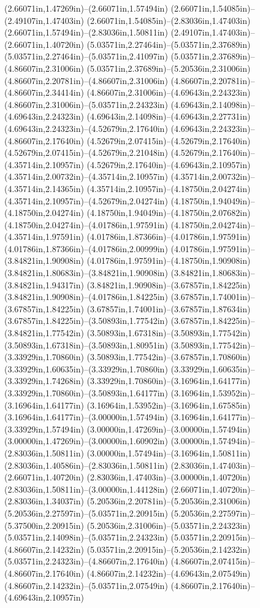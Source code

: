 (2.66071in,1.47269in)--(2.66071in,1.57494in) (2.66071in,1.54085in)--(2.49107in,1.47403in) (2.66071in,1.54085in)--(2.83036in,1.47403in) (2.66071in,1.57494in)--(2.83036in,1.50811in) (2.49107in,1.47403in)--(2.66071in,1.40720in) (5.03571in,2.27464in)--(5.03571in,2.37689in) (5.03571in,2.27464in)--(5.03571in,2.41097in) (5.03571in,2.37689in)--(4.86607in,2.31006in) (5.03571in,2.37689in)--(5.20536in,2.31006in) (4.86607in,2.20781in)--(4.86607in,2.31006in) (4.86607in,2.20781in)--(4.86607in,2.34414in) (4.86607in,2.31006in)--(4.69643in,2.24323in) (4.86607in,2.31006in)--(5.03571in,2.24323in) (4.69643in,2.14098in)--(4.69643in,2.24323in) (4.69643in,2.14098in)--(4.69643in,2.27731in) (4.69643in,2.24323in)--(4.52679in,2.17640in) (4.69643in,2.24323in)--(4.86607in,2.17640in) (4.52679in,2.07415in)--(4.52679in,2.17640in) (4.52679in,2.07415in)--(4.52679in,2.21048in) (4.52679in,2.17640in)--(4.35714in,2.10957in) (4.52679in,2.17640in)--(4.69643in,2.10957in) (4.35714in,2.00732in)--(4.35714in,2.10957in) (4.35714in,2.00732in)--(4.35714in,2.14365in) (4.35714in,2.10957in)--(4.18750in,2.04274in) (4.35714in,2.10957in)--(4.52679in,2.04274in) (4.18750in,1.94049in)--(4.18750in,2.04274in) (4.18750in,1.94049in)--(4.18750in,2.07682in) (4.18750in,2.04274in)--(4.01786in,1.97591in) (4.18750in,2.04274in)--(4.35714in,1.97591in) (4.01786in,1.87366in)--(4.01786in,1.97591in) (4.01786in,1.87366in)--(4.01786in,2.00999in) (4.01786in,1.97591in)--(3.84821in,1.90908in) (4.01786in,1.97591in)--(4.18750in,1.90908in) (3.84821in,1.80683in)--(3.84821in,1.90908in) (3.84821in,1.80683in)--(3.84821in,1.94317in) (3.84821in,1.90908in)--(3.67857in,1.84225in) (3.84821in,1.90908in)--(4.01786in,1.84225in) (3.67857in,1.74001in)--(3.67857in,1.84225in) (3.67857in,1.74001in)--(3.67857in,1.87634in) (3.67857in,1.84225in)--(3.50893in,1.77542in) (3.67857in,1.84225in)--(3.84821in,1.77542in) (3.50893in,1.67318in)--(3.50893in,1.77542in) (3.50893in,1.67318in)--(3.50893in,1.80951in) (3.50893in,1.77542in)--(3.33929in,1.70860in) (3.50893in,1.77542in)--(3.67857in,1.70860in) (3.33929in,1.60635in)--(3.33929in,1.70860in) (3.33929in,1.60635in)--(3.33929in,1.74268in) (3.33929in,1.70860in)--(3.16964in,1.64177in) (3.33929in,1.70860in)--(3.50893in,1.64177in) (3.16964in,1.53952in)--(3.16964in,1.64177in) (3.16964in,1.53952in)--(3.16964in,1.67585in) (3.16964in,1.64177in)--(3.00000in,1.57494in) (3.16964in,1.64177in)--(3.33929in,1.57494in) (3.00000in,1.47269in)--(3.00000in,1.57494in) (3.00000in,1.47269in)--(3.00000in,1.60902in) (3.00000in,1.57494in)--(2.83036in,1.50811in) (3.00000in,1.57494in)--(3.16964in,1.50811in) (2.83036in,1.40586in)--(2.83036in,1.50811in) (2.83036in,1.47403in)--(2.66071in,1.40720in) (2.83036in,1.47403in)--(3.00000in,1.40720in) (2.83036in,1.50811in)--(3.00000in,1.44128in) (2.66071in,1.40720in)--(2.83036in,1.34037in) (5.20536in,2.20781in)--(5.20536in,2.31006in) (5.20536in,2.27597in)--(5.03571in,2.20915in) (5.20536in,2.27597in)--(5.37500in,2.20915in) (5.20536in,2.31006in)--(5.03571in,2.24323in) (5.03571in,2.14098in)--(5.03571in,2.24323in) (5.03571in,2.20915in)--(4.86607in,2.14232in) (5.03571in,2.20915in)--(5.20536in,2.14232in) (5.03571in,2.24323in)--(4.86607in,2.17640in) (4.86607in,2.07415in)--(4.86607in,2.17640in) (4.86607in,2.14232in)--(4.69643in,2.07549in) (4.86607in,2.14232in)--(5.03571in,2.07549in) (4.86607in,2.17640in)--(4.69643in,2.10957in) 